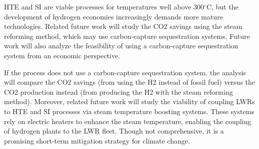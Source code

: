 HTE and SI are viable processes for temperatures well above 300$^{\circ}$C, but the development of hydrogen economies increasingly demands more mature technologies.
Related future work will study the \gls{CO2} savings using the steam reforming method, which may use carbon-capture sequestration systems.
Future work will also analyze the feasibility of using a carbon-capture sequestration system from an economic perspective.

If the process does not use a carbon-capture sequestration system, the analysis will compare the \gls{CO2} savings (from using the \gls{H2} instead of fossil fuel) versus the \gls{CO2} production instead (from producing the \gls{H2} with the steam reforming method).
Moreover, related future work will study the viability of coupling LWRs to HTE and SI processes via steam temperature boosting systems.
These systems rely on electric heaters to enhance the steam temperature, enabling the coupling of hydrogen plants to the LWR fleet.
Though not comprehensive, it is a promising short-term mitigation strategy for climate change.
